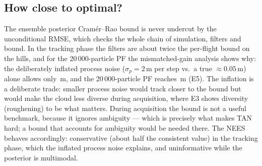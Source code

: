 \subsection{How close to optimal?}
The ensemble posterior Cramér--Rao bound is never undercut by the unconditional RMSE, which checks
the whole chain of simulation, filters and bound. In the tracking phase the filters are about twice
the per-flight bound on the hills, and for the 20\,000-particle PF the mismatched-gain analysis
shows why: the deliberately inflated process noise
($\sigma_p = 2$\,m per step vs.\ a true $\approx0.05$\,m) alone allows only
\EFivePlanHillPfTwoZeroZeroZeroZeroTuned\,m, and the 20\,000-particle PF reaches
\EFivePlanHillPfTwoZeroZeroZeroZeroRmse\,m (E5). The inflation is a deliberate trade:
smaller process noise would track closer to the bound but would make the cloud less diverse during
acquisition, where E3 shows diversity (roughening) to be what matters. During acquisition the
bound is not a useful benchmark, because it ignores ambiguity --- which is precisely what makes TAN
hard; a bound that accounts for ambiguity would be needed there. The NEES behaves accordingly:
conservative (about half the consistent value) in the tracking phase, which the inflated process
noise explains, and uninformative while the posterior is multimodal.

